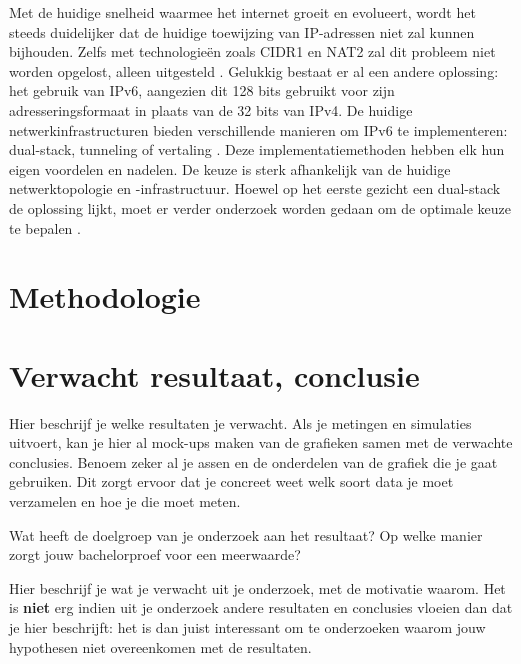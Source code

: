 Met de huidige snelheid waarmee het internet groeit en evolueert, wordt het steeds duidelijker dat de huidige toewijzing van IP-adressen niet zal kunnen bijhouden. 
Zelfs met technologieën zoals CIDR1 en NAT2 zal dit probleem niet worden opgelost, alleen uitgesteld \autocite{Gu2005}.
Gelukkig bestaat er al een andere oplossing: het gebruik van IPv6, aangezien dit 128 bits gebruikt voor zijn adresseringsformaat in plaats van de 32 bits van IPv4. 
De huidige netwerkinfrastructuren bieden verschillende manieren om IPv6 te implementeren: dual-stack, tunneling of vertaling \autocite{Zunainah2021}. 
Deze implementatiemethoden hebben elk hun eigen voordelen en nadelen. De keuze is sterk afhankelijk van de huidige netwerktopologie en -infrastructuur. 
Hoewel op het eerste gezicht een dual-stack de oplossing lijkt, moet er verder onderzoek worden gedaan om de optimale keuze te bepalen \autocite{Zehl2001}.


\section{Methodologie}%
\label{sec:methodologie}


\section{Verwacht resultaat, conclusie}%
\label{sec:verwachte_resultaten}

Hier beschrijf je welke resultaten je verwacht. Als je metingen en simulaties uitvoert, kan je hier al mock-ups maken van de grafieken samen met de verwachte conclusies. Benoem zeker al je assen en de onderdelen van de grafiek die je gaat gebruiken. Dit zorgt ervoor dat je concreet weet welk soort data je moet verzamelen en hoe je die moet meten.

Wat heeft de doelgroep van je onderzoek aan het resultaat? Op welke manier zorgt jouw bachelorproef voor een meerwaarde?

Hier beschrijf je wat je verwacht uit je onderzoek, met de motivatie waarom. Het is \textbf{niet} erg indien uit je onderzoek andere resultaten en conclusies vloeien dan dat je hier beschrijft: het is dan juist interessant om te onderzoeken waarom jouw hypothesen niet overeenkomen met de resultaten.

